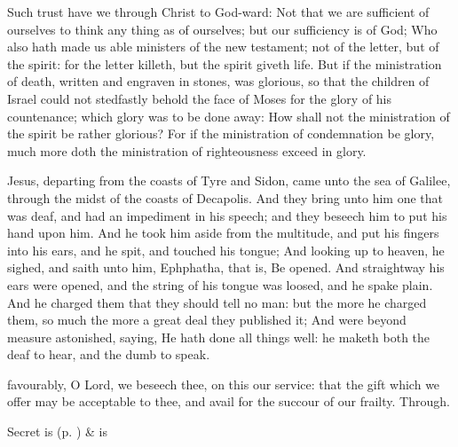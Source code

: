  Such trust have we through Christ to God-ward: Not that we are sufficient of ourselves to think any thing as of ourselves; but our sufficiency is of God; Who also hath made us able ministers of the new testament; not of the letter, but of the spirit: for the letter killeth, but the spirit giveth life. But if the ministration of death, written and engraven in stones, was glorious, so that the children of Israel could not stedfastly behold the face of Moses for the glory of his countenance; which glory was to be done away: How shall not the ministration of the spirit be rather glorious? For if the ministration of condemnation be glory, much more doth the ministration of righteousness exceed in glory.


 Jesus, departing from the coasts of Tyre and Sidon, came unto the sea of Galilee, through the midst of the coasts of Decapolis. And they bring unto him one that was deaf, and had an impediment in his speech; and they beseech him to put his hand upon him. And he took him aside from the multitude, and put his fingers into his ears, and he spit, and touched his tongue; And looking up to heaven, he sighed, and saith unto him, Ephphatha, that is, Be opened. And straightway his ears were opened, and the string of his tongue was loosed, and he spake plain. And he charged them that they should tell no man: but the more he charged them, so much the more a great deal they published it; And were beyond measure astonished, saying, He hath done all things well: he maketh both the deaf to hear, and the dumb to speak.


\secret
{} favourably, O Lord, we beseech thee, on this our service: that the gift which we offer may be acceptable to thee, and avail for the succour of our frailty. Through.
\begin{rubric}
     Secret is  (p. \pageref{SPSaints}) \&  is 
\end{rubric}


